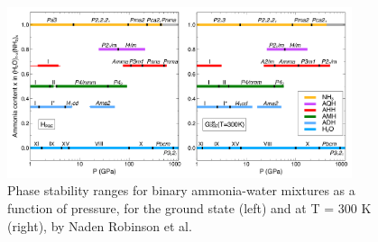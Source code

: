 \documentclass[11pt]{article}
\begin{document}
\begin{figure}[h]
    \centering
    \includegraphics[width=0.9\textwidth]{figures/phase-diagram.png}
    \caption{Phase stability ranges for binary ammonia-water mixtures as a function of pressure, for the ground state (left) and at T = 300 K (right), by Naden Robinson et al. \cite{original}}
\end{figure}
\begin{multicols}{2}
 

\normalsize\normalsize
\end{multicols}
\end{document}
